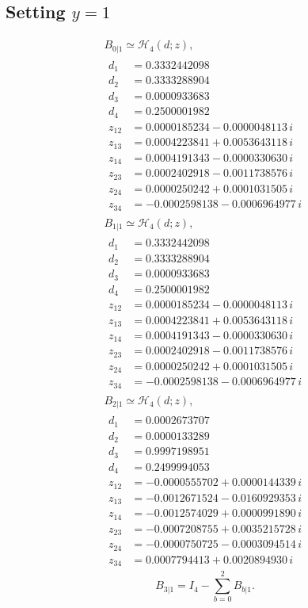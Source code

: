 \documentclass[11pt]{article}
\begin{document}
\subsection*{Setting $y=1$}
\[
\begin{gathered}
B_{0|1}\simeq\mathcal H_4(d;z),\\[3pt]
\begin{aligned}
d_1&=0.3332442098 \\
d_2&=0.3333288904 \\
d_3&=0.0000933683 \\
d_4&=0.2500001982 \\
z_{12}&=0.0000185234-0.0000048113\,i \\
z_{13}&=0.0004223841+0.0053643118\,i \\
z_{14}&=0.0004191343-0.0000330630\,i \\
z_{23}&=0.0002402918-0.0011738576\,i \\
z_{24}&=0.0000250242+0.0001031505\,i \\
z_{34}&=-0.0002598138-0.0006964977\,i
\end{aligned}
\end{gathered}
\]
\[
\begin{gathered}
B_{1|1}\simeq\mathcal H_4(d;z),\\[3pt]
\begin{aligned}
d_1&=0.3332442098 \\
d_2&=0.3333288904 \\
d_3&=0.0000933683 \\
d_4&=0.2500001982 \\
z_{12}&=0.0000185234-0.0000048113\,i \\
z_{13}&=0.0004223841+0.0053643118\,i \\
z_{14}&=0.0004191343-0.0000330630\,i \\
z_{23}&=0.0002402918-0.0011738576\,i \\
z_{24}&=0.0000250242+0.0001031505\,i \\
z_{34}&=-0.0002598138-0.0006964977\,i
\end{aligned}
\end{gathered}
\]
\[
\begin{gathered}
B_{2|1}\simeq\mathcal H_4(d;z),\\[3pt]
\begin{aligned}
d_1&=0.0002673707 \\
d_2&=0.0000133289 \\
d_3&=0.9997198951 \\
d_4&=0.2499994053 \\
z_{12}&=-0.0000555702+0.0000144339\,i \\
z_{13}&=-0.0012671524-0.0160929353\,i \\
z_{14}&=-0.0012574029+0.0000991890\,i \\
z_{23}&=-0.0007208755+0.0035215728\,i \\
z_{24}&=-0.0000750725-0.0003094514\,i \\
z_{34}&=0.0007794413+0.0020894930\,i
\end{aligned}
\end{gathered}
\]
\[
B_{3|1}=I_4-\sum_{b=0}^2B_{b|1}.
\]
\end{document}
